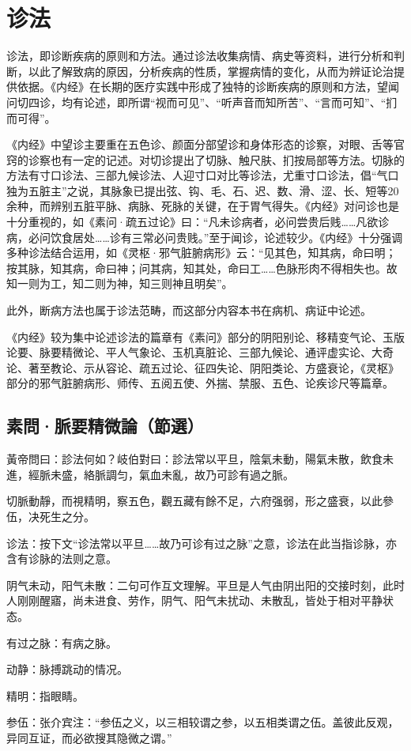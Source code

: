 \documentclass[12pt]{ctexbook}
\begin{document}
\pagestyle{main2}
\fi
\chapter{诊法}%

诊法，即诊断疾病的原则和方法。通过诊法收集病情、病史等资料，进行分析和判断，以此了解致病的原因，分析疾病的性质，掌握病情的变化，从而为辨证论治提供依据。《内经》在长期的医疗实践中形成了独特的诊断疾病的原则和方法，望闻问切四诊，均有论述，即所谓“视而可见”、“听声音而知所苦”、“言而可知”、“扪而可得”。

《内经》中望诊主要重在五色诊、颜面分部望诊和身体形态的诊察，对眼、舌等官窍的诊察也有一定的记述。对切诊提出了切脉、触尺肤、扪按局部等方法。切脉的方法有寸口诊法、三部九候诊法、人迎寸口对比等诊法，尤重寸口诊法，倡“气口独为五脏主”之说，其脉象已提出弦、钩、毛、石、迟、数、滑、涩、长、短等20余种，而辨别五脏平脉、病脉、死脉的关键，在于胃气得失。《内经》对问诊也是十分重视的，如《素问·疏五过论》曰：“凡未诊病者，必问尝贵后贱……凡欲诊病，必问饮食居处……诊有三常必问贵贱。”至于闻诊，论述较少。《内经》十分强调多种诊法结合运用，如《灵枢·邪气脏腑病形》云：“见其色，知其病，命曰明；按其脉，知其病，命曰神；问其病，知其处，命曰工……色脉形肉不得相失也。故知一则为工，知二则为神，知三则神且明矣”。

此外，断病方法也属于诊法范畴，而这部分内容本书在病机、病证中论述。

《内经》较为集中论述诊法的篇章有《素问》部分的阴阳别论、移精变气论、玉版论要、脉要精微论、平人气象论、玉机真脏论、三部九候论、通评虚实论、大奇论、著至教论、示从容论、疏五过论、征四失论、阴阳类论、方盛衰论，《灵枢》部分的邪气脏腑病形、师传、五阅五使、外揣、禁服、五色、论疾诊尺等篇章。

\section{素問·脈要精微論（節選）}%


\begin{yuanwen}
黃帝問曰：診法何如？岐伯對曰：診法常以平旦，陰氣未動，陽氣未散，飲食未進，經脈未盛，絡脈調匀，氣血未亂，故乃可診有過之脈。

切脈動靜，而視精明，察五色，觀五藏有餘不足，六府强弱，形之盛衰，以此參伍，决死生之分。
\end{yuanwen}


\begin{jiaozhu}
  \item 诊法：按下文“诊法常以平旦……故乃可诊有过之脉”之意，诊法在此当指诊脉，亦含有诊脉的法则之意。
  \item 阴气未动，阳气未散：二句可作互文理解。平旦是人气由阴出阳的交接时刻，此时人刚刚醒寤，尚未进食、劳作，阴气、阳气未扰动、未散乱，皆处于相对平静状态。
  \item 有过之脉：有病之脉。
  \item 动静：脉搏跳动的情况。
  \item 精明：指眼睛。
  \item 参伍：张介宾注：“参伍之义，以三相较谓之参，以五相类谓之伍。盖彼此反观，异同互证，而必欲搜其隐微之谓。”
\end{jiaozhu}
\end{document}
